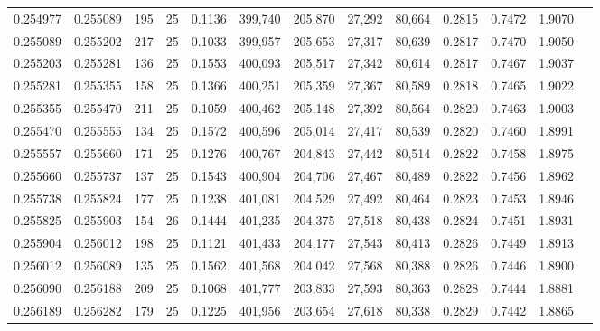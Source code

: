 \begin{tabular}{rrrrrrrrrrrrr}
0.254977 & 0.255089 &   195 &  25 &                                     0.1136 & 399,740 & 205,870 &  27,292 &  80,664 & 0.2815 & 0.7472 & 1.9070 \\
0.255089 & 0.255202 &   217 &  25 &                                     0.1033 & 399,957 & 205,653 &  27,317 &  80,639 & 0.2817 & 0.7470 & 1.9050 \\
0.255203 & 0.255281 &   136 &  25 &                                     0.1553 & 400,093 & 205,517 &  27,342 &  80,614 & 0.2817 & 0.7467 & 1.9037 \\
0.255281 & 0.255355 &   158 &  25 &                                     0.1366 & 400,251 & 205,359 &  27,367 &  80,589 & 0.2818 & 0.7465 & 1.9022 \\
0.255355 & 0.255470 &   211 &  25 &                                     0.1059 & 400,462 & 205,148 &  27,392 &  80,564 & 0.2820 & 0.7463 & 1.9003 \\
0.255470 & 0.255555 &   134 &  25 &                                     0.1572 & 400,596 & 205,014 &  27,417 &  80,539 & 0.2820 & 0.7460 & 1.8991 \\
0.255557 & 0.255660 &   171 &  25 &                                     0.1276 & 400,767 & 204,843 &  27,442 &  80,514 & 0.2822 & 0.7458 & 1.8975 \\
0.255660 & 0.255737 &   137 &  25 &                                     0.1543 & 400,904 & 204,706 &  27,467 &  80,489 & 0.2822 & 0.7456 & 1.8962 \\
0.255738 & 0.255824 &   177 &  25 &                                     0.1238 & 401,081 & 204,529 &  27,492 &  80,464 & 0.2823 & 0.7453 & 1.8946 \\
0.255825 & 0.255903 &   154 &  26 &                                     0.1444 & 401,235 & 204,375 &  27,518 &  80,438 & 0.2824 & 0.7451 & 1.8931 \\
0.255904 & 0.256012 &   198 &  25 &                                     0.1121 & 401,433 & 204,177 &  27,543 &  80,413 & 0.2826 & 0.7449 & 1.8913 \\
0.256012 & 0.256089 &   135 &  25 &                                     0.1562 & 401,568 & 204,042 &  27,568 &  80,388 & 0.2826 & 0.7446 & 1.8900 \\
0.256090 & 0.256188 &   209 &  25 &                                     0.1068 & 401,777 & 203,833 &  27,593 &  80,363 & 0.2828 & 0.7444 & 1.8881 \\
0.256189 & 0.256282 &   179 &  25 &                                     0.1225 & 401,956 & 203,654 &  27,618 &  80,338 & 0.2829 & 0.7442 & 1.8865 \\

\end{tabular}
